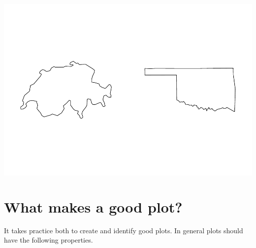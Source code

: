 \documentclass[
]{book}
\begin{document}
\includegraphics{_main_files/figure-latex/unnamed-chunk-245-1.pdf}

\hypertarget{what-makes-a-good-plot}{%
\section{What makes a good plot?}\label{what-makes-a-good-plot}}

It takes practice both to create and identify good plots. In general plots should have the following properties.
\end{document}
